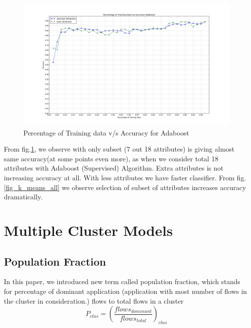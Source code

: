 \documentclass[conference]{IEEEtran}
\begin{document}
\begin{figure}[!t]
	\centering
	\includegraphics[width=7.16in]{selected_total_attr_adaboost}
	\caption{Percentage of Training data v/s Accuracy for Adaboost}
	\label{adaboost_selected_total}
\end{figure}
From fig.\ref{adaboost_selected_total}, we observe with only subset (7 out 18 attributes) is giving almost same accuracy(at some points even more), as when we consider total 18 attributes with Adaboost (Supervised) Algorithm\cite{}. Extra attributes is not increasing accuracy at all. With less attributes we have faster classifier. From fig.\ref{fig_k_means_all} we observe selection of subset of attributes increases accuracy dramatically. 

\section{Multiple Cluster Models}
\subsection{Population Fraction}
In this paper, we introduced new term called population fraction, which stands for percentage of dominant application (application with most number of flows in the cluster in consideration.) flows to total flows in a cluster
\begin{equation}
P_{clus} = (\frac{flows_{dominant}}{flows_{total}})_{clus}
\end{equation}
\end{document}
